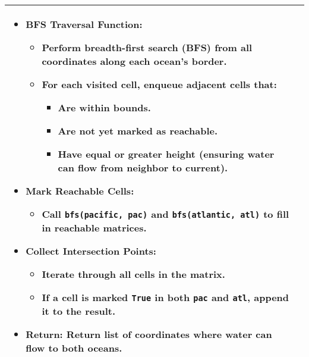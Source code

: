 \begin{summary}
\begin{center}
\begin{tabular}{ll}
{\begin{itemize}
                    \item \textbf{BFS Traversal Function:}
                    \begin{itemize}
                        \item Perform breadth-first search (BFS) from all coordinates along each ocean's border.
                        \item For each visited cell, enqueue adjacent cells that:
                        \begin{itemize}
                            \item Are within bounds.
                            \item Are not yet marked as reachable.
                            \item Have equal or greater height (ensuring water can flow from neighbor to current).
                        \end{itemize}
                    \end{itemize}
                
                    \item \textbf{Mark Reachable Cells:}
                    \begin{itemize}
                        \item Call \texttt{bfs(pacific, pac)} and \texttt{bfs(atlantic, atl)} to fill in reachable matrices.
                    \end{itemize}
                
                    \item \textbf{Collect Intersection Points:}
                    \begin{itemize}
                        \item Iterate through all cells in the matrix.
                        \item If a cell is marked \texttt{True} in both \texttt{pac} and \texttt{atl}, append it to the result.
                    \end{itemize}
                
                    \item \textbf{Return:} Return list of coordinates where water can flow to both oceans.
                \end{itemize}                             
            } \\
            \bottomrule
        \end{tabular}
    \end{center}
\end{summary}
\newpage

